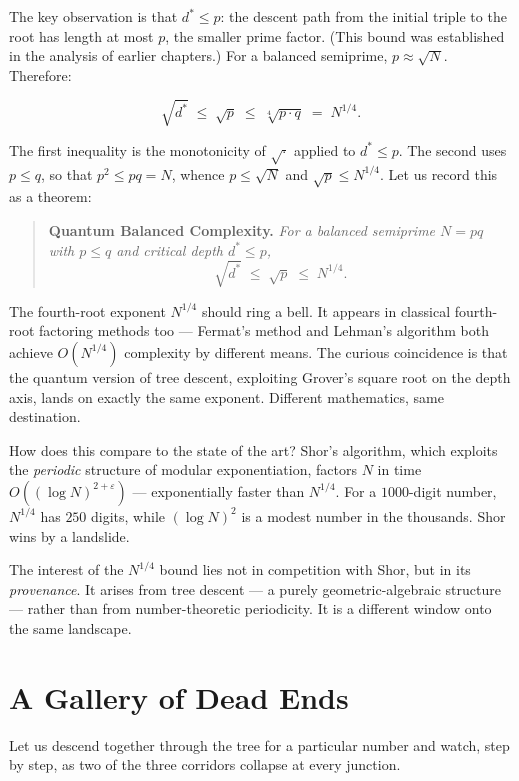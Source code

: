 \documentclass[11pt,twoside,openright]{book}
\theoremstyle{definition}
\theoremstyle{remark}
\begin{document}
The key observation is that $d^* \leq p$: the descent path from the initial triple to the root has length at most $p$, the smaller prime factor. (This bound was established in the analysis of earlier chapters.) For a balanced semiprime, $p \approx \sqrt{N}$. Therefore:

\[\sqrt{d^*} \;\leq\; \sqrt{p} \;\leq\; \sqrt[4]{p \cdot q} \;=\; N^{1/4}.\]

The first inequality is the monotonicity of $\sqrt{\cdot}$ applied to $d^* \leq p$. The second uses $p \leq q$, so that $p^2 \leq pq = N$, whence $p \leq \sqrt{N}$ and $\sqrt{p} \leq N^{1/4}$. Let us record this as a theorem:

\begin{quote}
\textbf{Quantum Balanced Complexity.} \textit{For a balanced semiprime $N = pq$ with $p \leq q$ and critical depth $d^* \leq p$,}
$$\sqrt{d^*} \;\leq\; \sqrt{p} \;\leq\; N^{1/4}.$$
\end{quote}
The fourth-root exponent $N^{1/4}$ should ring a bell. It appears in classical fourth-root factoring methods too --- Fermat's method and Lehman's algorithm both achieve $O(N^{1/4})$ complexity by different means. The curious coincidence is that the quantum version of tree descent, exploiting Grover's square root on the depth axis, lands on exactly the same exponent. Different mathematics, same destination.

How does this compare to the state of the art? Shor's algorithm, which exploits the \textit{periodic} structure of modular exponentiation, factors $N$ in time $O((\log N)^{2+\varepsilon})$ --- exponentially faster than $N^{1/4}$. For a $1000$-digit number, $N^{1/4}$ has $250$ digits, while $(\log N)^2$ is a modest number in the thousands. Shor wins by a landslide.

The interest of the $N^{1/4}$ bound lies not in competition with Shor, but in its \textit{provenance}. It arises from tree descent --- a purely geometric-algebraic structure --- rather than from number-theoretic periodicity. It is a different window onto the same landscape.



\section{A Gallery of Dead Ends}

Let us descend together through the tree for a particular number and watch, step by step, as two of the three corridors collapse at every junction.
\end{document}
